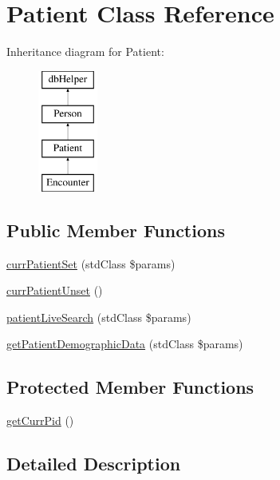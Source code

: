 \hypertarget{class_patient}{\section{\-Patient \-Class \-Reference}
\label{class_patient}
}
\-Inheritance diagram for \-Patient\-:\begin{figure}[H]
\begin{center}
\leavevmode
\includegraphics[height=4.000000cm]{class_patient}
\end{center}
\end{figure}
\subsection*{\-Public \-Member \-Functions}
\begin{DoxyCompactItemize}
\item 
\hyperlink{class_patient_a61881e13afab7b713729f4000e7be366}{curr\-Patient\-Set} (std\-Class \$params)
\item 
\hyperlink{class_patient_a141a4228884369275f14b3b6a2ba047b}{curr\-Patient\-Unset} ()
\item 
\hyperlink{class_patient_a5da7543bb87e70c01a1a3b3180c712fc}{patient\-Live\-Search} (std\-Class \$params)
\item 
\hyperlink{class_patient_a603592cb352f8f8eeeb8d977b136b056}{get\-Patient\-Demographic\-Data} (std\-Class \$params)
\end{DoxyCompactItemize}
\subsection*{\-Protected \-Member \-Functions}
\begin{DoxyCompactItemize}
\item 
\hyperlink{class_patient_ac4117c3ef6ed85a03718844b09041e11}{get\-Curr\-Pid} ()
\end{DoxyCompactItemize}


\subsection{\-Detailed \-Description}


